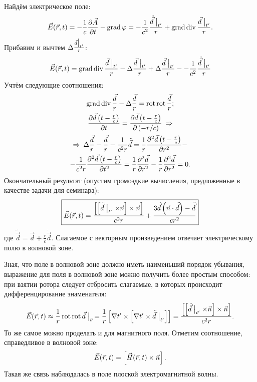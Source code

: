     Найдём электрическое поле:
    \begin{gather*}
        \vec{E}(\vec{r}, t) = -\frac 1c \frac{\partial\vec{A}}{\partial t} - \operatorname{grad}\varphi = 
        -\frac{1}{c^2}\frac{\ddot{\vec{d}}\bigm|_{t'}}{r} + \operatorname{grad}\operatorname{div}\frac{\vec{d}\bigm|_{t'}}{r}.
    \end{gather*}
    Прибавим и вычтем $\Delta\frac{\vec{d}\bigm|_{t'}}{r}$:
    \begin{gather}
        \vec{E}(\vec{r}, t) = \operatorname{grad}\operatorname{div}\frac{\vec{d}\bigm|_{t'}}{r} - \Delta\frac{\vec{d}\bigm|_{t'}}{r} + \Delta\frac{\vec{d}\bigm|_{t'}}{r}
        - -\frac{1}{c^2}\frac{\ddot{\vec{d}}\bigm|_{t'}}{r}
    \end{gather}
    Учтём следующие соотношения:
    \begin{gather*}
        \operatorname{grad}\operatorname{div}\frac{\vec{d}}{r} - \Delta\frac{\vec{d}}{r} = \operatorname{rot}\operatorname{rot}\frac{\vec{d}}{r};\\
        \frac{\partial\vec{d}\left({t - \frac{r}{c}}\right)}{\partial t} = \frac{\partial\vec{d}\left({t - \frac{r}{c}}\right)}{\partial\left({-r / c}\right)} \: \Rightarrow \\
        \Rightarrow \: \Delta\frac{\vec{d}}{r} - \frac{\vec{d}}{r} - \frac{1}{c^2r}\ddot{\vec{d}} =
        \frac 1r \frac{\partial^2\vec{d}\left({t - \frac{r}{c}}\right)}{\partial{r}^2} - \\ - \frac{1}{c^2r}\frac{\partial^2\vec{d}\left({t - \frac{r}{c}}\right)}{\partial{t}^2}=
        \frac 1r \frac{\partial^2\vec{d}}{\partial{r}^2} - \frac 1r \frac{\partial^2\vec{d}}{\partial{r}^2} = 0.
    \end{gather*}
    Окончательный результат (опустим громоздкие вычисления, предложенные в качестве задачи для семинара):
    \[
        \boxed{\vec{E}(\vec{r}, t) = \frac{\left[{\left[{\ddot{\vec{d}}\bigm|_{t'} \times \vec{n}}\right] \times \vec{n}}\right]}{c^2 r} +
        \frac{3\tilde{\vec{d}}\left({\vec{n} \cdot \tilde{\vec{d}}}\right) - \tilde{\vec{d}}}{cr^2}}
    \]
    где $\displaystyle \tilde{\vec{d}} = \vec{d} + \frac{r}{c}\dot{\vec{d}}$. Слагаемое с векторным произведением отвечает
    электрическому полю в волновой зоне.

    Зная, что поле в волновой зоне должно иметь наименьший порядок убывания, выражение для поля в волновой зоне можно получить более простым
    способом: при взятии ротора следует отбросить слагаемые, в которых происходит дифференцирование знаменателя:
    \[
        \vec{E}(\vec{r}, t) \approx \frac 1r \operatorname{rot}\operatorname{rot} \vec{d}\bigm|_{t'} = \frac 1r \left[{\nabla t' \times \left[{\nabla t' \times \ddot{\vec{d}}\bigm|_{t'}}\right]}\right] = 
        \frac{\left[{\left[{\ddot{\vec{d}}\bigm|_{t'} \times \vec{n}}\right] \times \vec{n}}\right]}{c^2r}.
    \]
    То же самое можно проделать и для магнитного поля. Отметим соотношение, справедливое в волновой зоне:
    \[
        \vec{E}(\vec{r}, t) = \left[{\vec{H}(\vec{r}, t) \times \vec{n}}\right].
    \]
    Такая же связь наблюдалась в поле плоской электромагнитной волны.

